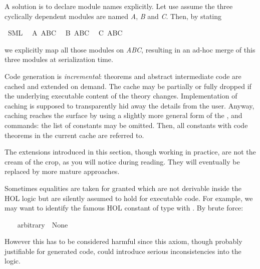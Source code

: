 \begin{isabellebody}
\begin{isamarkuptext}
  A solution is to declare module names explicitly.
  Let use assume the three cyclically dependent
  modules are named \emph{A}, \emph{B} and \emph{C}.
  Then, by stating%
\end{isamarkuptext}%
\isamarkuptrue%
\isamarkupfalse%
\ SML\isanewline
\ \ A\ ABC\isanewline
\ \ B\ ABC\isanewline
\ \ C\ ABC%
\begin{isamarkuptext}%
we explicitly map all those modules on \emph{ABC},
  resulting in an ad-hoc merge of this three modules
  at serialization time.%
\end{isamarkuptext}%
\isamarkuptrue%
%
\isamarkuptrue%
%
\begin{isamarkuptext}%
Code generation is \emph{incremental}: theorems
  and abstract intermediate code are cached and extended on demand.
  The cache may be partially or fully dropped if the underlying
  executable content of the theory changes.
  Implementation of caching is supposed to transparently
  hid away the details from the user.  Anyway, caching
  reaches the surface by using a slightly more general form
  of the \isa{{\isasymCODETHMS}}, \isa{{\isasymCODEDEPS}}
  and \isa{{\isasymCODEGEN}} commands: the list of constants
  may be omitted.  Then, all constants with code theorems
  in the current cache are referred to.%
\end{isamarkuptext}%
\isamarkuptrue%
%
\isamarkuptrue%
%
\begin{isamarkuptext}%
\begin{warn}
    The extensions introduced in this section, though working
    in practice, are not the cream of the crop, as you
    will notice during reading.  They will
    eventually be replaced by more mature approaches.
  \end{warn}

  Sometimes equalities are taken for granted which are
  not derivable inside the HOL logic but are silently assumed
  to hold for executable code.  For example, we may want
  to identify the famous HOL constant 
  of type  with .
  By brute force:%
\end{isamarkuptext}%
\isamarkuptrue%
\isamarkupfalse%
\ \isanewline
\ \ {\isachardoublequoteopen}arbitrary\ {\isacharequal}\ None{\isachardoublequoteclose}%
\begin{isamarkuptext}%
However this has to be considered harmful since this axiom,
  though probably justifiable for generated code, could
  introduce serious inconsistencies into the logic.


\end{isamarkuptext}
\end{isabellebody}
